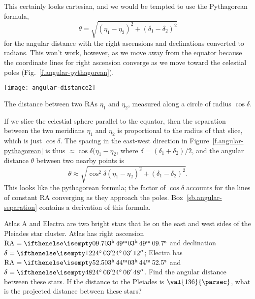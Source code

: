 This certainly looks cartesian, and we would be tempted to use the Pythagorean formula,
\[
	\theta = \sqrt{(\eta_{1}-\eta_{2})^{2}+(\delta_{1}-\delta_{2})^{2}}
\]
for the angular distance with the right ascensions and declinations converted to radians. This won't work, however, as we move away from the equator because the coordinate lines for right ascension converge as we move toward the celestial poles (Fig.~\ref{f.angular-pythagorean}).
\begin{marginfigure}
\texttt{[image: angular-distance2]}
\caption[Angular distance between lines of constant right ascension]{The distance between two RAs $\eta_{1}$ and $\eta_{2}$, measured along a circle of radius $\cos\delta$.}
\label{f.angular-pythagorean}
\end{marginfigure}

If we slice the celestial sphere parallel to the equator, then the separation between the two meridians $\eta_{1}$ and $\eta_{2}$ is proportional to the radius of that slice, which is  just $\cos\delta$. The spacing in the east-west direction in Figure~\ref{f.angular-pythagorean} is thus $\approx\cos\delta(\eta_{1}-\eta_{2}$, where $\delta = (\delta_{1}+\delta_{2})/2$, and the angular distance $\theta$ between two nearby points is
\begin{equation}\label{e.angular-separation}
\theta \approx \sqrt{\cos^{2}\delta\left(\eta_{1}-\eta_{2}\right)^{2} + \left(\delta_{1}-\delta_{2}\right)^{2}}.
\end{equation}
This looks like the pythagorean formula; the factor of $\cos\delta$ accounts for the lines of constant RA converging as they approach the poles. Box~\ref{sb.angular-separation} contains a derivation of this formula.

\begin{exercisebox}
Atlas A and Electra are two bright stars that lie on the east and west sides of the Pleiades star cluster.  Atlas has right ascension $\RA = \hrangle{03}{49}{09.7}$ and declination $\delta = \dec{24}{03}{12}$; Electra has $\RA = \hrangle{03}{44}{52.5}$ and $\delta = \dec{24}{06}{48}$.  Find the angular distance between these stars.  If the distance to the Pleiades is $\val{136}{\parsec}$, what is the projected distance between these stars?
\end{exercisebox}

